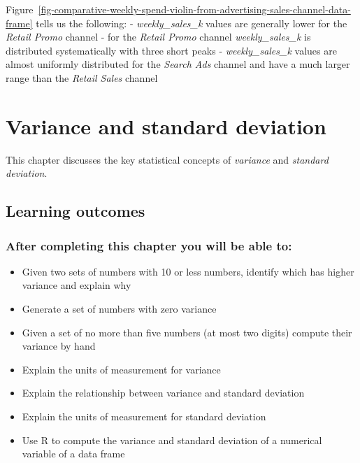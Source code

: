 \documentclass[
  12pt,
  letterpaper,
  DIV=11,
  numbers=noendperiod]{scrreprt}
\providecommand{\tightlist}{%
  \setlength{\itemsep}{0pt}\setlength{\parskip}{0pt}}
\begin{document}
Figure~\ref{fig-comparative-weekly-spend-violin-from-advertising-sales-channel-data-frame}
tells us the following: - \emph{weekly\_sales\_k} values are generally
lower for the \emph{Retail Promo} channel - for the \emph{Retail Promo}
channel \emph{weekly\_sales\_k} is distributed systematically with three
short peaks - \emph{weekly\_sales\_k} values are almost uniformly
distributed for the \emph{Search Ads} channel and have a much larger
range than the \emph{Retail Sales} channel

\chapter{Variance and standard deviation}\label{sec-variance-sd}

This chapter discusses the key statistical concepts of \emph{variance}
and \emph{standard deviation}.

\section*{Learning outcomes}\label{learning-outcomes-3}


\subsection*{After completing this chapter you will be able
to:}\label{after-completing-this-chapter-you-will-be-able-to-1}

\begin{itemize}
\tightlist
\item
  Given two sets of numbers with 10 or less numbers, identify which has
  higher variance and explain why
\item
  Generate a set of numbers with zero variance
\item
  Given a set of no more than five numbers (at most two digits) compute
  their variance by hand
\item
  Explain the units of measurement for variance
\item
  Explain the relationship between variance and standard deviation
\item
  Explain the units of measurement for standard deviation
\item
  Use R to compute the variance and standard deviation of a numerical
  variable of a data frame
\end{itemize}
\end{document}
